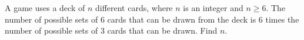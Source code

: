 A game uses a deck of $n$ different cards, where $n$ is an integer and $n \geq 6$. The number of possible sets of $6$ cards that can be drawn from the deck is $6$ times the number of possible sets of $3$ cards that can be drawn. Find $n$.